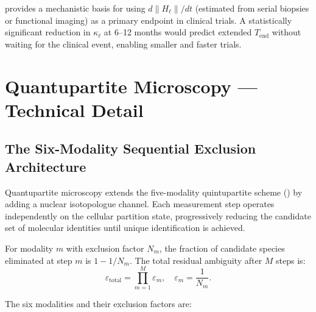 \begin{remark}
\label{rem:ch04-holonomy-trial-endpoint}
 provides a mechanistic basis for using
$d\|H_\ell\|/dt$ (estimated from serial biopsies or functional imaging)
as a primary endpoint in clinical trials.  A statistically significant
reduction in $\kappa_\ell$ at 6--12 months would predict extended
$T_{\mathrm{end}}$ without waiting for the clinical event, enabling smaller
and faster trials.
\end{remark}

\section{Quantupartite Microscopy --- Technical Detail}
\label{sec:ch04-quantupartite-extended}

\subsection{The Six-Modality Sequential Exclusion Architecture}

Quantupartite microscopy extends the five-modality quintupartite scheme
() by adding a nuclear isotopologue channel.
Each measurement step operates independently on the cellular partition
state, progressively reducing the candidate set of molecular identities
until unique identification is achieved.

\begin{definition}
\label{def:ch04-exclusion-factor}
For modality $m$ with exclusion factor $N_m$, the fraction of candidate
species eliminated at step $m$ is $1 - 1/N_m$.  The total residual
ambiguity after $M$ steps is:
\begin{equation}
\label{eq:ch04-epsilon-total}
    \varepsilon_{\mathrm{total}} = \prod_{m=1}^{M} \varepsilon_m,
    \quad \varepsilon_m = \frac{1}{N_m}.
\end{equation}
\end{definition}

The six modalities and their exclusion factors are:

